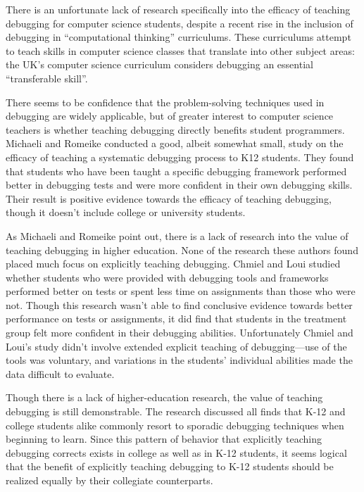 \documentclass[12pt]{article}
\begin{document}
There is an unfortunate lack of research specifically into the
efficacy of teaching debugging for computer science students, despite
a recent rise in the inclusion of debugging in ``computational
thinking'' curriculums\cite{10.1145/3361721.3361724}.  These
curriculums attempt to teach skills in computer science classes that
translate into other subject areas: the UK's computer science
curriculum considers debugging an essential ``transferable
skill''\cite{10.1145/2602484}.\par There seems to be confidence that
the problem-solving techniques used in debugging are widely
applicable, but of greater interest to computer science teachers is
whether teaching debugging directly benefits student programmers.
Michaeli and Romeike conducted a good, albeit somewhat small, study on
the efficacy of teaching a systematic debugging process to K12
students.  They found that students who have been taught a specific
debugging framework performed better in debugging tests and were more
confident in their own debugging skills\cite{10.1145/3361721.3361724}.
Their result is positive evidence towards the efficacy of teaching
debugging, though it doesn't include college or university
students.\par

As Michaeli and Romeike point out, there is a lack of research into
the value of teaching debugging in higher education.  None of the
research these authors found placed much focus on explicitly teaching
debugging.  Chmiel and Loui studied whether students who were provided
with debugging tools and frameworks performed better on tests or spent
less time on assignments than those who were
not\cite{10.1145/971300.971310}.  Though this research wasn't able to
find conclusive evidence towards better performance on tests or
assignments, it did find that students in the treatment group felt
more confident in their debugging abilities.  Unfortunately Chmiel and
Loui's study didn't involve extended explicit teaching of
debugging---use of the tools was voluntary, and variations in the
students' individual abilities made the data difficult to
evaluate.\par

Though there is a lack of higher-education research, the value of
teaching debugging is still demonstrable.  The research discussed all
finds that K-12 and college students alike commonly resort to sporadic
debugging techniques when beginning to learn.  Since this pattern of
behavior that explicitly teaching debugging corrects exists in college
as well as in K-12 students, it seems logical that the benefit of
explicitly teaching debugging to K-12 students should be realized
equally by their collegiate counterparts.\par
\end{document}
